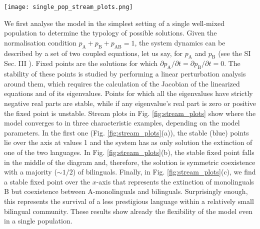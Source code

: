 \documentclass[../thesis.tex]{subfiles}
\begin{document}
\begin{figure*}
    \centering
    \texttt{[image: single\_pop\_stream\_plots.png]}
    \caption{Flow diagrams for the dynamics of two languages according to our model
    described in equation \eqref{eq:bipref_model} set in a well-mixed population.
    $p_{\text{A}}$ and $p_{\text{B}}$ denote the proportions of monolinguals in A and B,
    respectively, and the proportion of bilinguals $p_{\text{AB}}$ is such that
    $p_{\text{A}} + p_{\text{B}} + p_{\text{AB}} = 1$. The mortality rate is fixed at
    $\mu = 0.02$. (a) For $s = q = 1/2$ and $c=0.02$, the stable outcome is
    extinction of one of the two languages. (b) For $s = q = 1/2$ and $c =
    0.05$, the higher learning rate leads to a solution featuring stable coexistence.
    (c) For $s = 0.57$, $q = 0.45$ and $c = 0.05$, despite the lower prestige,
    B survives in a small community of bilinguals as it is the preferred language among
    them.}
    \label{fig:stream_plots}
\end{figure*}

We first analyse the model in the simplest setting of a single well-mixed population to
determine the typology of possible solutions. Given the normalisation condition
$p_\text{A}+p_\text{B}+p_\text{AB} = 1$, the system dynamics can be described by a set
of two coupled equations, let us say, for $p_\text{A}$ and $p_\text{B}$ (see the SI Sec.
III \cite{supp}). Fixed points are the solutions for which $\partial p_\text{A}/\partial
t = \partial p_\text{B}/\partial t = 0$. The stability of these points is studied by
performing a linear perturbation analysis around them, which requires the calculation of
the Jacobian of the linearized equations and of its eigenvalues. Points for which all
the eigenvalues have strictly negative real parts are stable, while if any eigenvalue's
real part is zero or positive the fixed point is unstable. Stream plots in Fig.
\ref{fig:stream_plots} show where the model converges to in three characteristic
examples, depending on the model parameters. In the first one (Fig.
\ref{fig:stream_plots}(a)), the stable (blue) points lie over the axis at values
1 and the system has as only solution the extinction of one of the two languages. In
Fig. \ref{fig:stream_plots}(b), the stable fixed point falls in the middle of the
diagram and, therefore, the solution is symmetric coexistence with a majority ($\sim
1/2$) of bilinguals. Finally, in Fig. \ref{fig:stream_plots}(c), we find a stable
fixed point over the $x$-axis that represents the extinction of monolinguals B but
coexistence between A-monolinguals and bilinguals. Surprisingly enough, this represents
the survival of a less prestigious language within a relatively small bilingual
community. These results show already the flexibility of the model even in a single
population.
\end{document}
